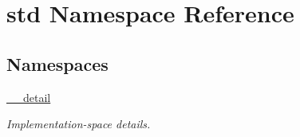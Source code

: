 \hypertarget{namespacestd}{}\section{std Namespace Reference}
\label{namespacestd}
\subsection*{Namespaces}
\begin{DoxyCompactItemize}
\item 
 \hyperlink{namespacestd_1_1____detail}{\+\_\+\+\_\+detail}
\begin{DoxyCompactList}\small\item\em Implementation-\/space details. \end{DoxyCompactList}\end{DoxyCompactItemize}
